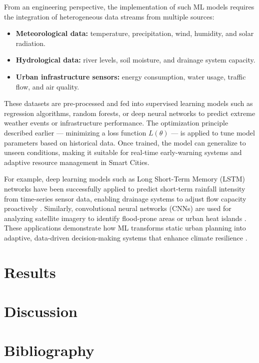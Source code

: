 \documentclass[12pt]{article}
\begin{document}
From an engineering perspective, the implementation of such ML models requires the integration of heterogeneous data streams from multiple sources:
\begin{itemize}
    \item \textbf{Meteorological data:} temperature, precipitation, wind, humidity, and solar radiation.
    \item \textbf{Hydrological data:} river levels, soil moisture, and drainage system capacity.
    \item \textbf{Urban infrastructure sensors:} energy consumption, water usage, traffic flow, and air quality.
\end{itemize}

These datasets are pre-processed and fed into supervised learning models such as regression algorithms, random forests, or deep neural networks to predict extreme weather events or infrastructure performance. 
The optimization principle described earlier --- minimizing a loss function \( L(\theta) \) --- is applied to tune model parameters based on historical data. 
Once trained, the model can generalize to unseen conditions, making it suitable for real-time early-warning systems and adaptive resource management in Smart Cities.

For example, deep learning models such as Long Short-Term Memory (LSTM) networks have been successfully applied to predict short-term rainfall intensity from time-series sensor data, enabling drainage systems to adjust flow capacity proactively \cite{kratzert2019towards}. 
Similarly, convolutional neural networks (CNNs) are used for analyzing satellite imagery to identify flood-prone areas or urban heat islands \cite{rolnick2022tackling}. 
These applications demonstrate how ML transforms static urban planning into adaptive, data-driven decision-making systems that enhance climate resilience \cite{mohanty2020ai,li2021sponge}.


\section{Results}
\lipsum[6-7]  %

\section{Discussion}
\lipsum[8-9]  %

\section{Bibliography}
\printbibliography[heading=none]

\end{document}
